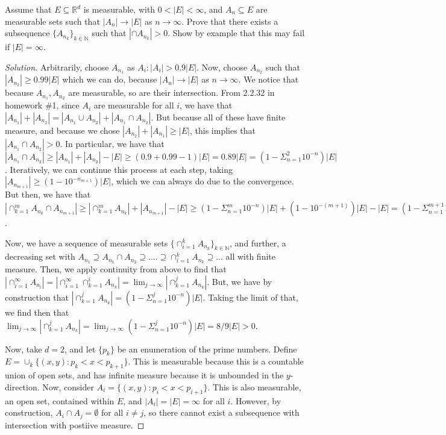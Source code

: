 \documentclass[10pt]{article}
\newenvironment{problem}[2][Problem]{\begin{trivlist}
\item[\hskip \labelsep {\bfseries #1}\hskip \labelsep {\bfseries #2.}]}{\end{trivlist}}
\begin{document}
\begin{problem}{2.3.17}
Assume that $E \subseteq \mathbb{R}^d$ is measurable, with $0 < |E| < \infty$, and $A_n \subseteq E$ are measurable sets such that $|A_n| \rightarrow |E|$ as $n \rightarrow \infty$. Prove that there exists a subsequence $\{ A_{n_k} \}_{k \in \mathbb{N}}$ such that $|\cap A_{n_k}| > 0$. Show by example that this may fail if $|E| = \infty$.
\end{problem}
\begin{proof}[Solution]
Arbitrarily, choose $A_{n_1}$ as $A_i : |A_i| > 0.9|E|$. Now, choose $A_{n_2}$ such that $|A_{n_2}| \geq 0.99|E|$ which we can do, because $|A_n| \rightarrow |E|$ as $n \rightarrow \infty$. We notice that because $A_{n_1}, A_{n_2}$ are measurable, so are their intersection. From 2.2.32 in homework \#1, since $A_i$ are measurable for all $i$, we have that $|A_{n_1}| + |A_{n_2}| = |A_{n_1} \cup A_{n_2}| + |A_{n_1} \cap A_{n_2}|$. But because all of these have finite measure, and because we chose $|A_{n_2}| + |A_{n_1}| \geq |E|$, this implies that $ |A_{n_1} \cap A_{n_2}| > 0$. In particular, we have that $|A_{n_1} \cap A_{n_2}| \geq |A_{n_1}| + |A_{n_2}| - |E| \geq (0.9 + 0.99 -1)|E| = 0.89|E| = (1 - \Sigma_{n=1}^2 10^{-n})|E|$. Iteratively, we can continue this process at each step, taking $|A_{n_{m+1}}| \geq (1-10^{-n_{m+1}})|E|$, which we can always do due to the convergence. But then, we have that $|\cap_{k=1}^m A_{n_k} \cap A_{n_{m+1}}| \geq |\cap_{k=1}^m A_{n_k}| + |A_{n_{m+1}}| - |E| \geq  (1 - \Sigma_{n=1}^m 10^{-n})|E| + (1-10^{-(m+1)})|E| - |E| = (1 - \Sigma_{n=1}^{m+1} 10^{-n}) |E|$.

Now, we have a sequence of measurable sets $\{ \cap_{i=1}^k A_{n_k} \}_{k \in \mathbb{N}} $, and further, a decreasing set with $A_{n_1} \supseteq A_{n_1} \cap A_{n_2} \supseteq .... \supseteq  \cap_{i=1}^k A_{n_k} \supseteq ... $ all with finite measure. Then, we apply continuity from above to find that $|\cap_{i=1}^\infty A_{n_i}| = |\cap_{i=1}^\infty \cap_{k=1}^i A_{n_k}| = \lim_{j \to \infty} | \cap_{k=1}^j A_{n_k}|$. But, we have by construction that  $| \cap_{k=1}^j A_{n_k}| =  (1 - \Sigma_{n=1}^{j} 10^{-n}) |E|$. Taking the limit of that, we find then that $\lim_{j \to \infty} | \cap_{k=1}^j A_{n_k}|= \lim_{j \to \infty} (1 - \Sigma_{n=1}^{j} 10^{-n}) |E| = 8/9 |E| > 0$.

Now, take $d = 2$, and let $\{ p_k \}$ be an enumeration of the prime numbers. Define $E = \cup_{k} \{ (x,y) : p_k < x < p_{k+1} \}$. This is measurable because this is a countable union of open sets, and has infinite measure because it is unbounded in the $y$-direction. Now, consider $A_i =  \{ (x,y) : p_i < x < p_{i+1} \}$. This is also measurable, an open set, contained within $E$, and $|A_i| = |E| = \infty$ for all $i$. However, by construction, $A_i \cap A_j = \emptyset$ for all $i \not = j$, so there cannot exist a subsequence with intersection with postiive measure.  


\end{proof}
\end{document}
